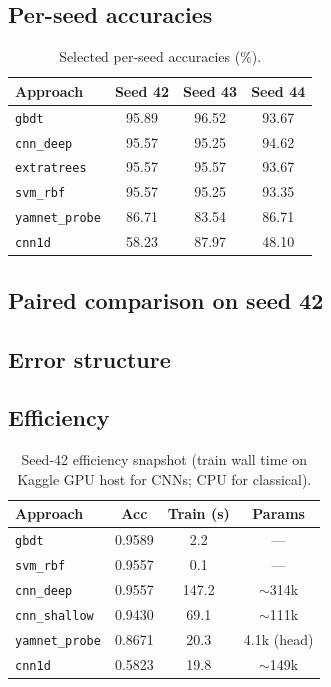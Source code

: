 \subsection{Per-seed accuracies}
\begin{table}[H]
\centering
\caption{Selected per-seed accuracies (\%).}
\label{tab:perseed}
\begin{tabular}{@{}lccc@{}}
\toprule
Approach & Seed 42 & Seed 43 & Seed 44 \\
\midrule
\texttt{gbdt} & 95.89 & 96.52 & 93.67 \\
\texttt{cnn\_deep} & 95.57 & 95.25 & 94.62 \\
\texttt{extratrees} & 95.57 & 95.57 & 93.67 \\
\texttt{svm\_rbf} & 95.57 & 95.25 & 93.35 \\
\texttt{yamnet\_probe} & 86.71 & 83.54 & 86.71 \\
\texttt{cnn1d} & 58.23 & 87.97 & 48.10 \\
\bottomrule
\end{tabular}
\end{table}

\subsection{Paired comparison on seed 42}

\subsection{Error structure}

\subsection{Efficiency}
\begin{table}[H]
\centering
\caption{Seed-42 efficiency snapshot (train wall time on Kaggle GPU host for CNNs; CPU for classical).}
\label{tab:eff}
\begin{tabular}{@{}lccc@{}}
\toprule
Approach & Acc & Train (s) & Params \\
\midrule
\texttt{gbdt} & 0.9589 & 2.2 & --- \\
\texttt{svm\_rbf} & 0.9557 & 0.1 & --- \\
\texttt{cnn\_deep} & 0.9557 & 147.2 & $\sim$314k \\
\texttt{cnn\_shallow} & 0.9430 & 69.1 & $\sim$111k \\
\texttt{yamnet\_probe} & 0.8671 & 20.3 & 4.1k (head) \\
\texttt{cnn1d} & 0.5823 & 19.8 & $\sim$149k \\
\bottomrule
\end{tabular}
\end{table}

